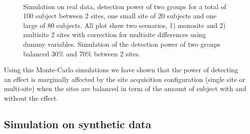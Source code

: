 \documentclass[authoryear]{elsarticle}
\begin{document}
\begin{figure}[tbp]
\centering
\captionsetup[subfloat]{labelformat=empty}
\\
\caption{
Simulation on real data, detection power of two groups for a total of 100 subject between 2 sites, one small site of 20 subjects and one large of 80 subjects. All plot show two scenarios, 1) monosite and 2) multisite 2 sites with correction for multisite differences using dummy variables. Simulation of the detection power of two groups balanced 30\% and 70\% between 2 sites.
}
\label{fig_real_sim_debalancing_2sites}
\end{figure}

Using this Monte-Carlo simulations we have shown that the power of detecting an effect is marginally affected by the site acquisition configuration (single site or multi-site) when the sites are balanced in term of the amount of subject with and without the effect. 


\subsection{Simulation on synthetic data}
 
\end{document}
